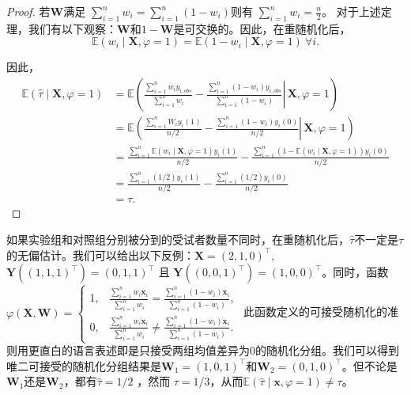 \begin{proof}

    若$\mathbf{W}$满足 $\sum _{i=1}^n w_i=\sum _{i=1}^n\left(1-w_i\right)$则有 $\sum _{i=1}^n w_i=\frac{n}{2}$。
    对于上述定理，我们有以下观察：$\mathbf{W}$和$1-\mathbf{W}$是可交换的。因此，在重随机化后，
    \begin{equation}
        \mathbb{E}(w_i \mid \mathbf{X}, \varphi=1)=\mathbb{E}(1-w_i \mid \mathbf{X}, \varphi=1)\  \forall i.
    \end{equation}
    
    因此，
    $$
        \begin{aligned}
        \mathbb{E}(\hat{\tau} \mid \mathbf{X}, \varphi=1) & =\mathbb{E}\left(\left.\frac{\sum_{i=1}^n w_i y_{i, o b s}}{\sum _{i=1}^n w_i}-\frac{\sum_{i=1}^n\left(1-w_i\right) y_{i, o b s}}{\sum _{i=1}^n (1-w_i)} \right\rvert\, \mathbf{X}, \varphi=1\right) \\
        & =\mathbb{E}\left(\left.\frac{\sum_{i=1}^n W_i y_i(1)}{n / 2}-\frac{\sum_{i=1}^n\left(1-w_i\right) y_i(0)}{n / 2} \right\rvert\, \mathbf{X}, \varphi=1\right) \\
        & =\frac{\sum_{i=1}^n \mathbb{E}\left(w_i \mid \mathbf{X},\varphi=1\right) y_i(1)}{n / 2}-\frac{\sum_{i=1}^n\left(1-\mathbb{E}\left(w_i \mid \mathbf{X}, \varphi=1\right)\right) y_i(0)}{n / 2} \\
        & =\frac{\sum_{i=1}^n(1 / 2) y_i(1)}{n / 2}-\frac{\sum_{i=1}^n(1 / 2) y_i(0)}{n / 2} \\
        & =\tau.
        \end{aligned}
    $$
\end{proof}

如果实验组和对照组分别被分到的受试者数量不同时，在重随机化后，$\hat{\tau}$不一定是$\tau$的无偏估计。我们可以给出以下反例：$\mathbf{X}=(2, 1, 0)^{\top}$, $\mathbf{Y}((1, 1, 1)^{\top}) = (0, 1, 1)^{\top}$ 且 $\mathbf{Y}((0, 0, 1)^{\top}) = (1, 0, 0)^{\top}$。同时，函数$\varphi(\mathbf{X}, \mathbf{W})= \begin{cases}1, & \frac{\sum_{i=1}^nw_i\mathbf{x}_i}{\sum_{i=1}^nw_i} = \frac{\sum _{i=1}^n\left(1-w_i\right)\mathbf{x}_i}{\sum _{i=1}^n\left(1-w_i\right)},\\ 0, & \frac{\sum _{i=1}^nw_i\mathbf{x}_i}{\sum _{i=1}^nw_i} \neq \frac{\sum _{i=1}^n\left(1-w_i\right)\mathbf{x}_i}{\sum _{i=1}^n\left(1-w_i\right)}.\end{cases}$
此函数定义的可接受随机化的准则用更直白的语言表述即是只接受两组均值差异为0的随机化分组。我们可以得到唯二可接受的随机化分组结果是$\mathbf{W}_1=(1, 0, 1)^{\top}$和$\mathbf{W}_2=(0, 1, 0)^{\top}$。但不论是$\mathbf{W}_1$还是$\mathbf{W}_2$，都有$\hat{\tau}= 1/2$ ，然而 $\tau = 1/3$，从而$\mathbb{E}(\hat{\tau} \mid \mathbf{x}, \varphi=1)\neq \tau$。



